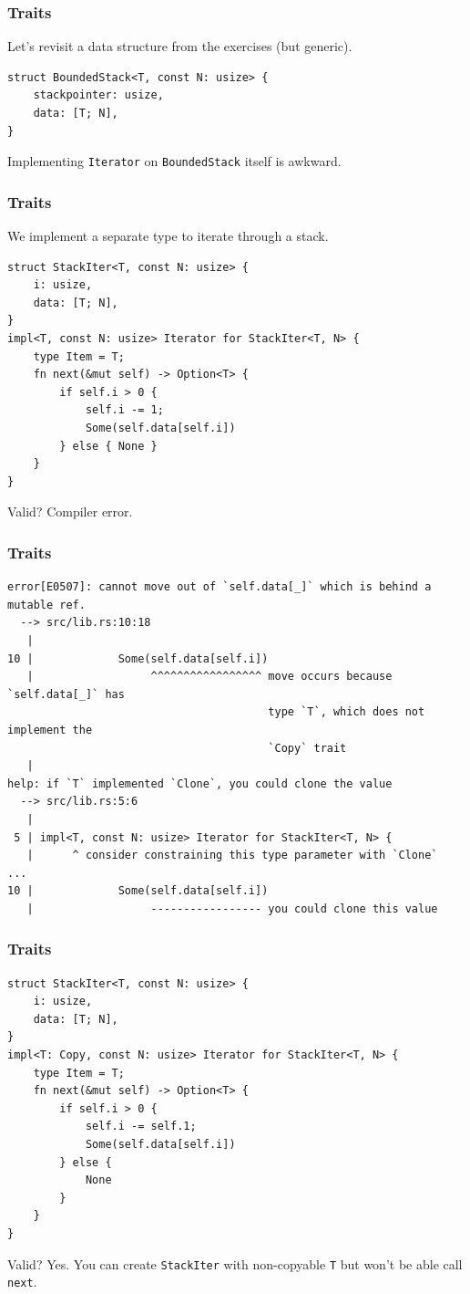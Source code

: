 \begin{frame}[fragile]
    \frametitle{Traits}
    Let's revisit a data structure from the exercises (but generic).
    \pause
    \vfill
    \begin{verbatim}
struct BoundedStack<T, const N: usize> {
    stackpointer: usize,
    data: [T; N],
}
    \end{verbatim}
    \pause
    \vfill
    Implementing \texttt{Iterator} on \texttt{BoundedStack} itself is awkward.
\end{frame}

\begin{frame}[fragile]
    \frametitle{Traits}
    We implement a separate type to iterate through a stack.
    \pause
    \vfill
    \begin{verbatim}
struct StackIter<T, const N: usize> {
    i: usize,
    data: [T; N],
}
impl<T, const N: usize> Iterator for StackIter<T, N> {
    type Item = T;
    fn next(&mut self) -> Option<T> {
        if self.i > 0 {
            self.i -= 1;
            Some(self.data[self.i])
        } else { None }
    }
}
    \end{verbatim}
    \pause
    \vfill
    Valid?
    \pause
    Compiler error.
\end{frame}

\begin{frame}[fragile]
    \frametitle{Traits}
    \begin{verbatim}
error[E0507]: cannot move out of `self.data[_]` which is behind a mutable ref.
  --> src/lib.rs:10:18
   |
10 |             Some(self.data[self.i])
   |                  ^^^^^^^^^^^^^^^^^ move occurs because `self.data[_]` has
                                        type `T`, which does not implement the
                                        `Copy` trait
   |
help: if `T` implemented `Clone`, you could clone the value
  --> src/lib.rs:5:6
   |
 5 | impl<T, const N: usize> Iterator for StackIter<T, N> {
   |      ^ consider constraining this type parameter with `Clone`
...
10 |             Some(self.data[self.i])
   |                  ----------------- you could clone this value
    \end{verbatim}
\end{frame}

\begin{frame}[fragile]
    \frametitle{Traits}
    \begin{verbatim}
struct StackIter<T, const N: usize> {
    i: usize,
    data: [T; N],
}
impl<T: Copy, const N: usize> Iterator for StackIter<T, N> {
    type Item = T;
    fn next(&mut self) -> Option<T> {
        if self.i > 0 {
            self.i -= self.1;
            Some(self.data[self.i])
        } else {
            None
        }
    }
}
    \end{verbatim}
    \pause
    \vfill
    Valid?
    \pause
    Yes. You can create \texttt{StackIter} with non-copyable \texttt{T} but won't be able call \texttt{next}.
\end{frame}

